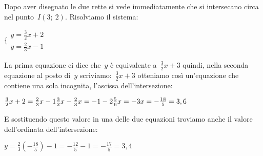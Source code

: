\begin{exrig}
\vspace{-12pt}

   Dopo aver disegnato le due rette si vede immediatamente che si intersecano 
   circa nel punto~$I(3;~2)$. Risolviamo il sistema:
   
   $\bigg \{
     \begin{array}{l}
      y = \frac{3}{2} x +2 \\
      y = \frac{2}{3} x -1
     \end{array}
   $
  
   La prima equazione ci dice che~$y$ è equivalente a~$\frac{3}{2} x + 3$ 
   quindi, nella seconda equazione al posto di~$y$ 
   scriviamo:~$\frac{3}{2} x + 3$ otteniamo così un'equazione che contiene 
   una sola incognita, l'ascissa dell'intersezione:
   
   $\frac{3}{2} x +2 = \frac{2}{3} x -1 \newline
    \frac{3}{2} x - \frac{2}{3} x = -1 -2 \newline
    \frac{5}{6} x = -3 \newline
    x = -\frac{18}{5} = 3,6$
   
   E sostituendo questo valore in una delle due equazioni troviamo anche il 
   valore dell'ordinata dell'intersezione:
   
   $y = \frac{2}{3} (-\frac{18}{5}) -1 
      = - \frac{12}{5} -1 = - \frac{17}{5} = 3,4$
\vspace{12pt}
\end{exrig}

